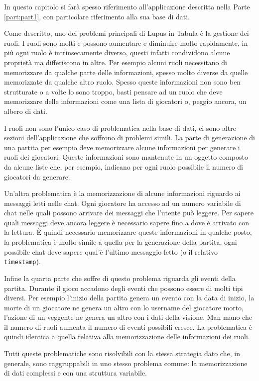 In questo capitolo si farà spesso riferimento all'applicazione descritta nella Parte \ref{part:part1}, con particolare riferimento alla sua base di dati.

Come descritto, uno dei problemi principali di Lupus in Tabula è la gestione dei ruoli. I ruoli sono molti e possono aumentare e diminuire molto rapidamente, in più ogni ruolo è intrinsecamente diverso, questi infatti condividono alcune proprietà ma differiscono in altre. Per esempio alcuni ruoli necessitano di memorizzare da qualche parte delle informazioni, spesso molto diverse da quelle memorizzate da qualche altro ruolo. Spesso queste informazioni non sono ben strutturate o a volte lo sono troppo, basti pensare ad un ruolo che deve memorizzare delle informazioni come una lista di giocatori o, peggio ancora, un albero di dati.

I ruoli non sono l'unico caso di problematica nella base di dati, ci sono altre sezioni dell'applicazione che soffrono di problemi simili. La parte di generazione di una partita per esempio deve memorizzare alcune informazioni per generare i ruoli dei giocatori. Queste informazioni sono mantenute in un oggetto composto da alcune liste che, per esempio, indicano per ogni ruolo possibile il numero di giocatori da generare.

Un'altra problematica è la memorizzazione di alcune informazioni riguardo ai messaggi letti nelle chat. Ogni giocatore ha accesso ad un numero variabile di chat nelle quali possono arrivare dei messaggi che l'utente può leggere. Per sapere quali messaggi deve ancora leggere è necessario sapere fino a dove è arrivato con la lettura. È quindi necessario memorizzare queste informazioni in qualche posto, la problematica è molto simile a quella per la generazione della partita, ogni possibile chat deve sapere qual'è l'ultimo messaggio letto (o il relativo \texttt{timestamp}).

Infine la quarta parte che soffre di questo problema riguarda gli eventi della partita. Durante il gioco accadono degli eventi che possono essere di molti tipi diversi. Per esempio l'inizio della partita genera un evento con la data di inizio, la morte di un giocatore ne genera un altro con lo username del giocatore morto, l'azione di un veggente ne genera un altro con i dati della visione. Man mano che il numero di ruoli aumenta il numero di eventi possibili cresce. La problematica è quindi identica a quella relativa alla memorizzazione delle informazioni dei ruoli.

Tutti queste problematiche sono risolvibili con la stessa strategia dato che, in generale, sono raggruppabili in uno stesso problema comune: la memorizzazione di dati complessi e con una struttura variabile.